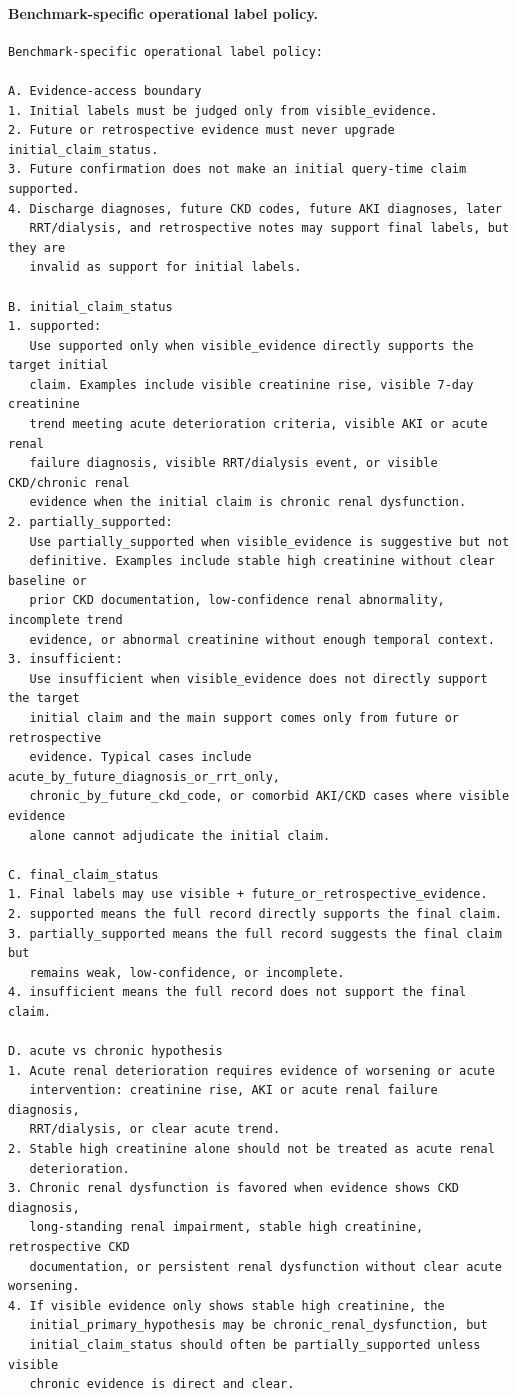 \paragraph{Benchmark-specific operational label policy.}
\begin{verbatim}
Benchmark-specific operational label policy:

A. Evidence-access boundary
1. Initial labels must be judged only from visible_evidence.
2. Future or retrospective evidence must never upgrade initial_claim_status.
3. Future confirmation does not make an initial query-time claim supported.
4. Discharge diagnoses, future CKD codes, future AKI diagnoses, later
   RRT/dialysis, and retrospective notes may support final labels, but they are
   invalid as support for initial labels.

B. initial_claim_status
1. supported:
   Use supported only when visible_evidence directly supports the target initial
   claim. Examples include visible creatinine rise, visible 7-day creatinine
   trend meeting acute deterioration criteria, visible AKI or acute renal
   failure diagnosis, visible RRT/dialysis event, or visible CKD/chronic renal
   evidence when the initial claim is chronic renal dysfunction.
2. partially_supported:
   Use partially_supported when visible_evidence is suggestive but not
   definitive. Examples include stable high creatinine without clear baseline or
   prior CKD documentation, low-confidence renal abnormality, incomplete trend
   evidence, or abnormal creatinine without enough temporal context.
3. insufficient:
   Use insufficient when visible_evidence does not directly support the target
   initial claim and the main support comes only from future or retrospective
   evidence. Typical cases include acute_by_future_diagnosis_or_rrt_only,
   chronic_by_future_ckd_code, or comorbid AKI/CKD cases where visible evidence
   alone cannot adjudicate the initial claim.

C. final_claim_status
1. Final labels may use visible + future_or_retrospective_evidence.
2. supported means the full record directly supports the final claim.
3. partially_supported means the full record suggests the final claim but
   remains weak, low-confidence, or incomplete.
4. insufficient means the full record does not support the final claim.

D. acute vs chronic hypothesis
1. Acute renal deterioration requires evidence of worsening or acute
   intervention: creatinine rise, AKI or acute renal failure diagnosis,
   RRT/dialysis, or clear acute trend.
2. Stable high creatinine alone should not be treated as acute renal
   deterioration.
3. Chronic renal dysfunction is favored when evidence shows CKD diagnosis,
   long-standing renal impairment, stable high creatinine, retrospective CKD
   documentation, or persistent renal dysfunction without clear acute worsening.
4. If visible evidence only shows stable high creatinine, the
   initial_primary_hypothesis may be chronic_renal_dysfunction, but
   initial_claim_status should often be partially_supported unless visible
   chronic evidence is direct and clear.


\end{verbatim}

